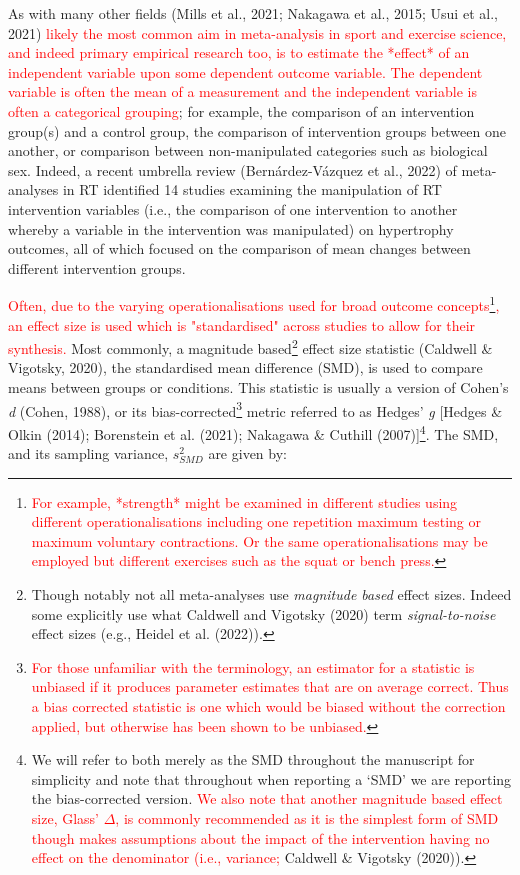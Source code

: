 \documentclass[
]{article}
\begin{document}
As with many other fields (Mills et al., 2021; Nakagawa et al., 2015; Usui et al., 2021) \textcolor{red}{likely the most common aim in meta-analysis in sport and exercise science, and indeed primary empirical research too, is to estimate the *effect* of an independent variable upon some dependent outcome variable. The dependent variable is often the mean of a measurement and the independent variable is often a categorical grouping}; for example, the comparison of an intervention group(s) and a control group, the comparison of intervention groups between one another, or comparison between non-manipulated categories such as biological sex. Indeed, a recent umbrella review (Bernárdez-Vázquez et al., 2022) of meta-analyses in RT identified 14 studies examining the manipulation of RT intervention variables (i.e., the comparison of one intervention to another whereby a variable in the intervention was manipulated) on hypertrophy outcomes, all of which focused on the comparison of mean changes between different intervention groups.

\textcolor{red}{Often, due to the varying operationalisations used for broad outcome concepts}\footnote{\textcolor{red}{For example, *strength* might be examined in different studies using different operationalisations including one repetition maximum testing or maximum voluntary contractions. Or the same operationalisations may be employed but different exercises such as the squat or bench press.}}\textcolor{red}{, an effect size is used which is "standardised" across studies to allow for their synthesis.} Most commonly, a magnitude based\footnote{Though notably not all meta-analyses use \emph{magnitude based} effect sizes. Indeed some explicitly use what Caldwell and Vigotsky (2020) term \emph{signal-to-noise} effect sizes (e.g., Heidel et al. (2022)).} effect size statistic (Caldwell \& Vigotsky, 2020), the standardised mean difference (SMD), is used to compare means between groups or conditions. This statistic is usually a version of Cohen's \emph{d} (Cohen, 1988), or its bias-corrected\footnote{\textcolor{red}{For those unfamiliar with the terminology, an estimator for a statistic is unbiased if it produces parameter estimates that are on average correct. Thus a bias corrected statistic is one which would be biased without the correction applied, but otherwise has been shown to be unbiased.}} metric referred to as Hedges' \emph{g} {[}Hedges \& Olkin (2014); Borenstein et al. (2021); Nakagawa \& Cuthill (2007){]}\footnote{We will refer to both merely as the SMD throughout the manuscript for simplicity and note that throughout when reporting a `SMD' we are reporting the bias-corrected version. \textcolor{red}{We also note that another magnitude based effect size, Glass' $\Delta$, is commonly recommended as it is the simplest form of SMD though makes assumptions about the impact of the intervention having no effect on the denominator (i.e., variance;} Caldwell \& Vigotsky (2020)).}. The SMD, and its sampling variance, \(s^2_{SMD}\) are given by:
\end{document}

